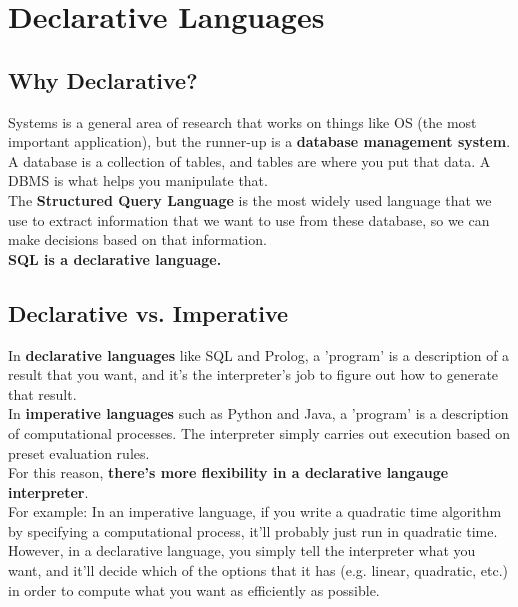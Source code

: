 \documentclass[12pt]{article}
\begin{document}
	\MakeScribeTop


\section{Declarative Languages}

\subsection{Why Declarative?}

Systems is a general area of research that works on things like OS (the most important application), but the runner-up is a \textbf{database management system}.\\

A database is a collection of tables, and tables are where you put that data. A DBMS is what helps you manipulate that.\\

The \textbf{Structured Query Language} is the most widely used language that we use to extract information that we want to use from these database, so we can make decisions based on that information.\\

\textbf{SQL is a declarative language.}

\subsection{Declarative vs. Imperative}

In \textbf{declarative languages} like SQL and Prolog, a 'program' is a description of a result that you want, and it's the interpreter's job to figure out how to generate that result.\\

In \textbf{imperative languages} such as Python and Java, a 'program' is a description of computational processes. The interpreter simply carries out execution based on preset evaluation rules.\\

For this reason, \textbf{there's more flexibility in a declarative langauge interpreter}.\\

For example: In an imperative language, if you write a quadratic time algorithm by specifying a computational process, it'll probably just run in quadratic time. However, in a declarative language, you simply tell the interpreter what you want, and it'll decide which of the options that it has (e.g. linear, quadratic, etc.) in order to compute what you want as efficiently as possible.\\
\end{document}
